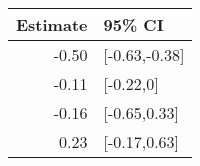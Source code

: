 \begin{tabular}{rl}
  \hline
Estimate & 95\% CI \\ 
  \hline
-0.50 & [-0.63,-0.38] \\ 
  -0.11 & [-0.22,0] \\ 
  -0.16 & [-0.65,0.33] \\ 
  0.23 & [-0.17,0.63] \\ 
   \hline
\end{tabular}

